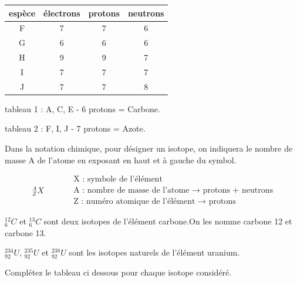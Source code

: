 \documentclass[
  11pt,
  a4paper,
  openany]{book}
\begin{document}
\begin{longtable}[]{@{}cccc@{}}
\toprule\noalign{}
espèce & électrons & protons & neutrons \\
\midrule\noalign{}
\endhead
\bottomrule\noalign{}
\endlastfoot
F & 7 & 7 & 6 \\
G & 6 & 6 & 6 \\
H & 9 & 9 & 7 \\
I & 7 & 7 & 7 \\
J & 7 & 7 & 8 \\
\end{longtable}

\begin{Answer}

tableau 1 : A, C, E - 6 protons = Carbone.

tableau 2 : F, I, J - 7 protons = Azote.

\newpage

\end{Answer}

Dans la notation chimique, pour désigner un isotope, on indiquera le nombre de masse A de l'atome en exposant en haut et à gauche du symbol.

\[ \begin{split}
  _{Z}^{A}X
  \end{split}
  \qquad
  \begin{split}
  & \text{X : symbole de l'élément} \\
    & \text{A : nombre de masse de l'atome $\rightarrow$ protons + neutrons} \\
    & \text{Z : numéro atomique de l'élément $\rightarrow$ protons}
  \end{split} \]

\(_{6}^{12}C\) et \(_{6}^{13}C\) sont deux isotopes de l'élément carbone.On les nomme carbone 12 et carbone 13.

\(_{92}^{234}U\), \(_{92}^{235}U\) et \(_{92}^{238}U\) sont les isotopes naturels de l'élément uranium.

\begin{Exercise}
Complétez le tableau ci dessous pour chaque isotope considéré.

\end{Exercise}
\end{document}
